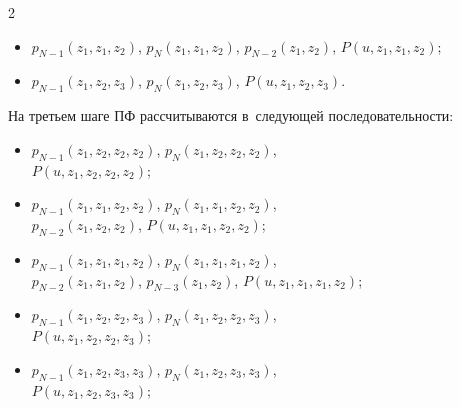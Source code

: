 \begin{multicols}{2}
\begin{itemize}
\item $p_{N-1}(z_1,z_1,z_2)$,  $p_{N}(z_1,z_{1},z_2)$, $p_{N-2}(z_1,z_2)$, $P(u,z_1,z_1,z_2)$;





\item $p_{N-1}(z_1,z_2,z_3)$,  $p_{N}(z_1,z_{2},z_3)$, $P(u,z_1,z_2,z_3)$.


\end{itemize}





На третьем шаге ПФ рассчитываются в~сле\-ду\-ющей последовательности:


\begin{itemize}





\item $p_{N-1}(z_1,z_2,z_2,z_2)$, $p_{N}(z_1,z_{2},z_2,z_2)$,\\


 $P(u,z_1,z_2,z_2,z_2)$;





\item $p_{N-1}(z_1,z_1,z_2,z_2)$,  $p_{N}(z_1,z_{1},z_2,z_2)$,\\


 $p_{N-2}(z_1,z_2,z_2)$, $P(u,z_1,z_1,z_2,z_2)$;





\item $p_{N-1}(z_1,z_1,z_1,z_2)$,  $p_{N}(z_1,z_{1},z_1,z_2)$,\\


 $p_{N-2}(z_1,z_1,z_2)$, $p_{N-3}(z_1,z_2)$, $P(u,z_1,z_1,z_1,z_2)$;





\item $p_{N-1}(z_1,z_2,z_2,z_3)$,  $p_{N}(z_1,z_{2},z_2,z_3)$,\\


 $P(u,z_1,z_2,z_2,z_3)$;





\item $p_{N-1}(z_1,z_2,z_3,z_3)$,  $p_{N}(z_1,z_{2},z_3,z_3)$,\\


 $P(u,z_1,z_2,z_3,z_3)$;






\end{itemize}
\end{multicols}
